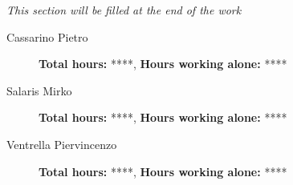 \textit{This section will be filled at the end of the work}

\begin{description}
	\item[Cassarino Pietro] %
	\textbf{Total hours:} ****, \textbf{Hours working alone:} ****
	\item[Salaris Mirko] %
	\textbf{Total hours:} ****, \textbf{Hours working alone:} ****
	\item[Ventrella Piervincenzo] %
	\textbf{Total hours:} ****, \textbf{Hours working alone:} ****
\end{description}